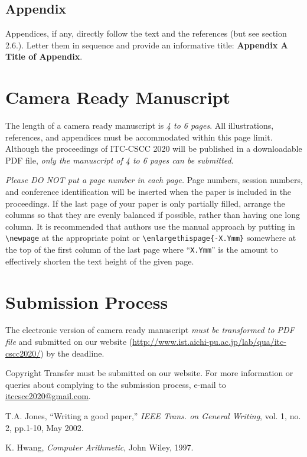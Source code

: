 \documentclass[10pt,twocolumn]{conference}
\begin{document}
\subsection{Appendix}
\noindent
 Appendices, if any, directly follow the text and the references (but see section 2.6.). Letter them in sequence and provide an informative title: {\bf Appendix A Title of Appendix}.

\section{Camera Ready Manuscript}
\noindent
The length of a camera ready manuscript is {\em 4 to 6 pages}. All illustrations, references, and appendices must be accommodated within this page limit. 
Although the proceedings of ITC-CSCC 2020 will be published in a downloadable PDF file, {\em only the manuscript of 4 to 6 pages can be submitted}. 

{\em Please DO NOT put a page number in each page.} Page numbers, session numbers, and conference identification will be inserted when the paper is included in the proceedings.
If the last page of your paper is only partially filled, arrange the columns so that they are evenly balanced if possible, rather than having one long column.
It is recommended that authors use the manual approach by putting in \verb!\newpage! at the appropriate
point or \verb!\enlargethispage{-X.Ymm}! somewhere at the top of the first column of the last page where ``\texttt{X.Ymm}'' is the amount to effectively shorten the text height of the given page.

\newpage

\section{Submission Process}
\noindent
The electronic version of camera ready manuscript {\em must be transformed to PDF file} and submitted on our website (\url{http://www.ist.aichi-pu.ac.jp/lab/qua/itc-cscc2020/}) by the deadline.

Copyright Transfer must be submitted on our website.
For more information or queries about complying to the submission process, e-mail to \url{itccscc2020@gmail.com}.

\begin{thebibliography}{}
T.A. Jones, ``Writing a good paper,'' {\it IEEE Trans. on General
Writing}, vol. 1, no. 2, pp.1-10, May 2002.

K. Hwang, {\it Computer Arithmetic}, John Wiley, 1997.

\end{thebibliography}
\appendix
\end{document}
